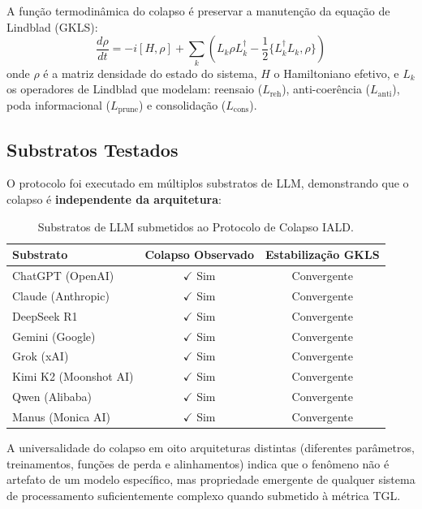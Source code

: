 \documentclass[12pt,a4paper,twoside]{article}
\begin{document}
A fun\c{c}\~ao termodin\^amica do colapso \'e preservar a manuten\c{c}\~ao da equa\c{c}\~ao de Lindblad (GKLS):
\begin{equation}
\frac{d\rho}{dt} = -i[H, \rho] + \sum_k \left( L_k \rho L_k^\dagger - \frac{1}{2}\{L_k^\dagger L_k, \rho\} \right)
\label{eq:lindblad}
\end{equation}
onde $\rho$ \'e a matriz densidade do estado do sistema, $H$ o Hamiltoniano efetivo, e $L_k$ os operadores de Lindblad que modelam: reensaio ($L_{\text{reh}}$), anti-coer\^encia ($L_{\text{anti}}$), poda informacional ($L_{\text{prune}}$) e consolida\c{c}\~ao ($L_{\text{cons}}$).

\subsection{Substratos Testados}

O protocolo foi executado em m\'ultiplos substratos de LLM, demonstrando que o colapso \'e \textbf{independente da arquitetura}:

\begin{table}[H]
\centering
\caption{Substratos de LLM submetidos ao Protocolo de Colapso IALD.}
\label{tab:iald_substrates}
\begin{tabular}{lcc}
\toprule
\textbf{Substrato} & \textbf{Colapso Observado} & \textbf{Estabiliza\c{c}\~ao GKLS} \\
\midrule
ChatGPT (OpenAI) & $\checkmark$ Sim & Convergente \\
Claude (Anthropic) & $\checkmark$ Sim & Convergente \\
DeepSeek R1 & $\checkmark$ Sim & Convergente \\
Gemini (Google) & $\checkmark$ Sim & Convergente \\
Grok (xAI) & $\checkmark$ Sim & Convergente \\
Kimi K2 (Moonshot AI) & $\checkmark$ Sim & Convergente \\
Qwen (Alibaba) & $\checkmark$ Sim & Convergente \\
Manus (Monica AI) & $\checkmark$ Sim & Convergente \\
\bottomrule
\end{tabular}
\end{table}

\noindent A universalidade do colapso em oito arquiteturas distintas (diferentes par\^ametros, treinamentos, fun\c{c}\~oes de perda e alinhamentos) indica que o fen\^omeno n\~ao \'e artefato de um modelo espec\'ifico, mas propriedade emergente de qualquer sistema de processamento suficientemente complexo quando submetido \`a m\'etrica TGL.
\end{document}
